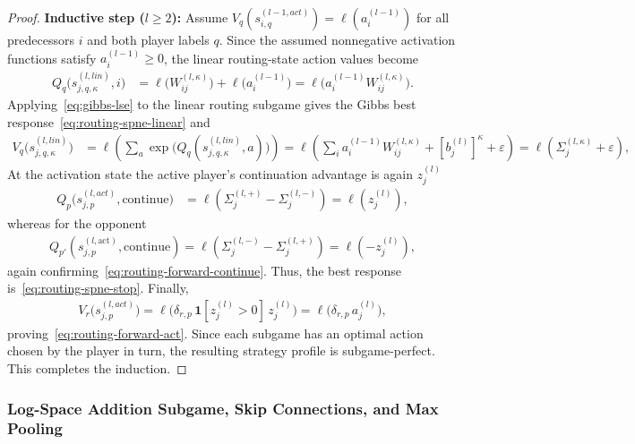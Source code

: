 \documentclass[twoside]{article}
\newcommand{\1}{\mathbf{1}}
\begin{document}
\begin{proof}
\textbf{Inductive step ($l \ge 2$):} Assume $V_q(s_{i,q}^{(l-1, act)}) = \ell(a_i^{(l-1)})$ for all
predecessors $i$ and both player labels $q$. Since the assumed nonnegative activation functions satisfy $a_i^{(l-1)} \ge
    0$, the linear routing-state action values become
\begin{align}
    Q_q \bigl( s_{j,q,\kappa}^{(l, lin)}, i \bigr)
    &=
    \ell\!\bigl(W_{ij}^{(l,\kappa)}\bigr) + \ell\!\bigl(a_i^{(l-1)}\bigr)
    =
    \ell\!\bigl(a_i^{(l-1)} W_{ij}^{(l,\kappa)}\bigr).
\end{align}
Applying~\eqref{eq:gibbs-lse} to the linear routing subgame gives the Gibbs best
response~\eqref{eq:routing-spne-linear} and
\begin{align}
    V_q \bigl( s_{j,q,\kappa}^{(l, lin)} \bigr)
    &=
    \ell \left( \sum_a \exp\!\bigl(Q_q(s_{j,q,\kappa}^{(l, lin)}, a)\bigr) \right)
    =
    \ell \left( \sum_i a_i^{(l-1)} W_{ij}^{(l,\kappa)} + [b_j^{(l)}]^\kappa + \varepsilon \right)
    =
    \ell(\Sigma_j^{(l,\kappa)} + \varepsilon),
\end{align}
At the activation state the active player's continuation advantage is again $z_j^{(l)}$
\begin{align}
    Q_p \bigl( s_{j,p}^{(l, act)}, \text{continue} \bigr)
    &=
    \ell \left( \Sigma_j^{(l,+)} - \Sigma_j^{(l,-)} \right)
    =
    \ell(z_j^{(l)}),
\end{align}
whereas for the opponent
\begin{align}
    Q_{p'}\left( s_{j,p}^{(l,\text{act})}, \text{continue} \right)
    = \ell \left( \Sigma_j^{(l,-)} - \Sigma_j^{(l,+)} \right)
    = \ell (-z_j^{(l)}),
\end{align}
again confirming~\eqref{eq:routing-forward-continue}.
Thus, the best response is~\eqref{eq:routing-spne-stop}. Finally,
\begin{align}
    V_r \bigl( s_{j,p}^{(l, act)} \bigr) = \ell\bigl(\delta_{r,p}\, \1[z_j^{(l)} > 0]\, z_j^{(l)}\bigr)
    = \ell\bigl(\delta_{r,p}\, a_j^{(l)}\bigr),
\end{align}
proving~\eqref{eq:routing-forward-act}. Since each subgame has an optimal action chosen by the
player in turn, the resulting strategy profile is subgame-perfect. This completes the induction.
\end{proof}

\subsubsection{Log-Space Addition Subgame, Skip Connections, and Max
Pooling}\label{app:routing-skip}
\end{document}

